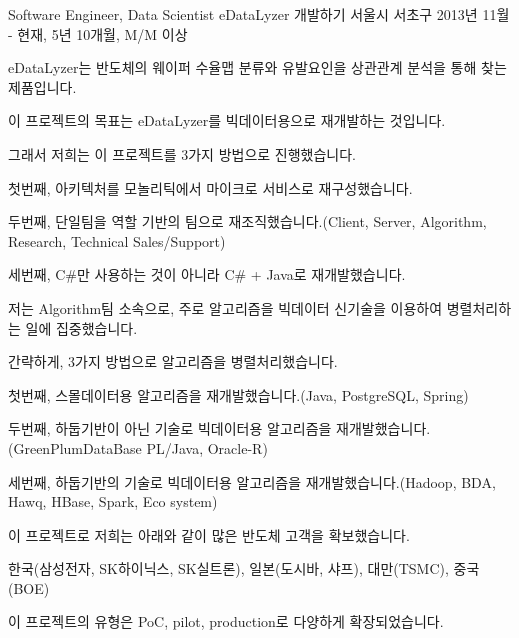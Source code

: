 

\begin{cventries}

  \cventry
    {Software Engineer, Data Scientist} %
    {eDataLyzer 개발하기} %
    {서울시 서초구} %
    {2013년 11월 - 현재, 5년 10개월, M/M 이상} %
    {
      \begin{cvitems} %
        \item {eDataLyzer는 반도체의 웨이퍼 수율맵 분류와 유발요인을 상관관계 분석을 통해 찾는 제품입니다.}
        \item {이 프로젝트의 목표는 eDataLyzer를 빅데이터용으로 재개발하는 것입니다.}
        \item {그래서 저희는 이 프로젝트를 3가지 방법으로 진행했습니다.}
        \item {첫번째, 아키텍처를 모놀리틱에서 마이크로 서비스로 재구성했습니다.}
        \item {두번째, 단일팀을 역할 기반의 팀으로 재조직했습니다.(Client, Server, Algorithm, Research, Technical Sales/Support)}
        \item {세번째, C\#만 사용하는 것이 아니라 C\# + Java로 재개발했습니다.}
        \item {저는 Algorithm팀 소속으로, 주로 알고리즘을 빅데이터 신기술을 이용하여 병렬처리하는 일에 집중했습니다.}
        \item {간략하게, 3가지 방법으로 알고리즘을 병렬처리했습니다.}
        \item {첫번째, 스몰데이터용 알고리즘을 재개발했습니다.(Java, PostgreSQL, Spring)}
        \item {두번째, 하둡기반이 아닌 기술로 빅데이터용 알고리즘을 재개발했습니다.(GreenPlumDataBase PL/Java, Oracle-R)}
        \item {세번째, 하둡기반의 기술로 빅데이터용 알고리즘을 재개발했습니다.(Hadoop, BDA, Hawq, HBase, Spark, Eco system)}
        \item {이 프로젝트로 저희는 아래와 같이 많은 반도체 고객을 확보했습니다.}
        \item {한국(삼성전자, SK하이닉스, SK실트론), 일본(도시바, 샤프), 대만(TSMC), 중국(BOE)}
        \item {이 프로젝트의 유형은 PoC, pilot, production로 다양하게 확장되었습니다.}
      \end{cvitems}
    }


\end{cventries}
